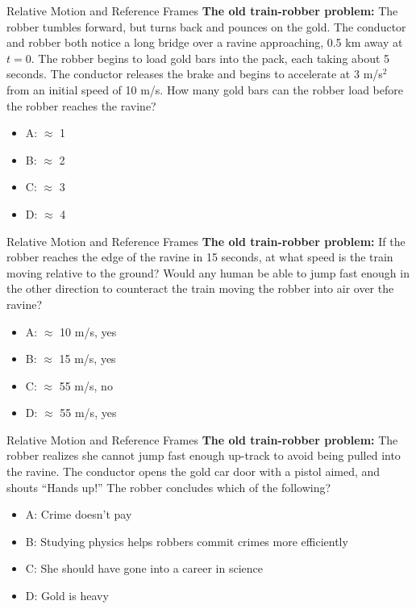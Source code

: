 \documentclass{beamer}
\begin{document}
\begin{frame}{Relative Motion and Reference Frames}
\small 
\textbf{The old train-robber problem:} The robber tumbles forward, but turns back and pounces on the gold.  The conductor and robber both notice a long bridge over a ravine approaching, 0.5 km away at $t=0$.  The robber begins to load gold bars into the pack, each taking about 5 seconds.  The conductor releases the brake and begins to accelerate at 3 m/s$^2$ from an initial speed of 10 m/s.  How many gold bars can the robber load before the robber reaches the ravine?\\
\begin{itemize}
\item A: $\approx$ 1
\item B: $\approx$ 2
\item C: $\approx$ 3
\item D: $\approx$ 4
\end{itemize}
\end{frame}

\begin{frame}{Relative Motion and Reference Frames}
\small 
\textbf{The old train-robber problem:} If the robber reaches the edge of the ravine in 15 seconds, at what speed is the train moving relative to the ground?  Would any human be able to jump fast enough in the other direction to counteract the train moving the robber into air over the ravine?\\
\begin{itemize}
\item A: $\approx$ 10 m/s, yes
\item B: $\approx$ 15 m/s, yes
\item C: $\approx$ 55 m/s, no
\item D: $\approx$ 55 m/s, yes
\end{itemize}
\end{frame}

\begin{frame}{Relative Motion and Reference Frames}
\small 
\textbf{The old train-robber problem:} The robber realizes she cannot jump fast enough up-track to avoid being pulled into the ravine.  The conductor opens the gold car door with a pistol aimed, and shouts ``Hands up!''  The robber concludes which of the following?  \\
\begin{itemize}
\item A: Crime doesn't pay
\item B: Studying physics helps robbers commit crimes more efficiently
\item C: She should have gone into a career in science
\item D: Gold is heavy
\end{itemize}
\end{frame}
\end{document}
